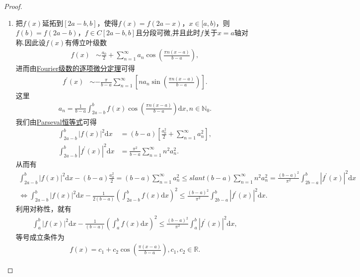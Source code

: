 \documentclass[../../main.tex]{subfiles}
\begin{document}
\begin{proof}
\begin{enumerate}[(1)]
\item 把$f(x)$延拓到$[2a - b,b]$，使得$f(x)=f(2a - x)$，$x\in[a,b)$，则$f(b)=f(2a - b)$，$f\in C[2a - b,b]$且分段可微,并且此时$f$关于$x=a$轴对称.因此设$f(x)$有傅立叶级数
\begin{align*}
f(x) &\sim \frac{a_0}{2}+\sum_{n = 1}^{\infty}a_n\cos\left(\frac{\pi n(x - a)}{b - a}\right),
\end{align*}
进而由\hyperref[theorem:Fourier级数的逐项微分定理]{Fourier级数的逐项微分定理}可得
\begin{align*}
f^{\prime}(x) &\sim -\frac{\pi}{b - a}\sum_{n = 1}^{\infty}[na_n\sin\left(\frac{\pi n(x - a)}{b - a}\right)].
\end{align*}
这里
\begin{align*}
a_n=\frac{1}{b - a}\int_{2a - b}^{b}f(x)\cos\left(\frac{\pi n(x - a)}{b - a}\right)\mathrm{d}x, n\in\mathbb{N}_0.
\end{align*}
我们由\hyperref[theorem:Parseval恒等式]{Parseval恒等式}可得
\begin{align*}
\int_{2a - b}^{b}|f(x)|^2\mathrm{d}x&=(b - a)\left[\frac{a_0^2}{2}+\sum_{n = 1}^{\infty}a_n^2\right],\\
\int_{2a - b}^{b}|f^{\prime}(x)|^2\mathrm{d}x&=\frac{\pi^2}{b - a}\sum_{n = 1}^{\infty}n^2a_n^2.
\end{align*}
从而有
\begin{gather*}
\int_{2a-b}^b{|f(x)|^2\mathrm{d}x}-\left( b-a \right) \frac{a_{0}^{2}}{2}=\left( b-a \right) \sum_{n=1}^{\infty}{a_{n}^{2}}\leqslant slant \left( b-a \right) \sum_{n=1}^{\infty}{n^2a_{n}^{2}}=\frac{(b-a)^2}{\pi ^2}\int_{2b-a}^b{|f^{\prime}(x)|^2\mathrm{d}x}
\\
\iff \int_{2a-b}^b{|f(x)|^2\mathrm{d}x}-\frac{1}{2(b-a)}\left( \int_{2a-b}^b{f(x)\mathrm{d}x} \right) ^2\le \frac{(b-a)^2}{\pi ^2}\int_{2b-a}^b{|f^{\prime}(x)|^2\mathrm{d}x}.
\end{gather*}
利用对称性，就有
\begin{align*}
\int_{a}^{b}|f(x)|^2\mathrm{d}x-\frac{1}{(b - a)}\left(\int_{a}^{b}f(x)\mathrm{d}x\right)^2\leqslant \frac{(b - a)^2}{\pi^2}\int_{a}^{b}|f^{\prime}(x)|^2\mathrm{d}x,
\end{align*}
等号成立条件为
\begin{align*}
f(x)=c_1 + c_2\cos\left(\frac{\pi(x - a)}{b - a}\right), c_1,c_2\in\mathbb{R}.
\end{align*}


\end{enumerate}
\end{proof}
\end{document}
